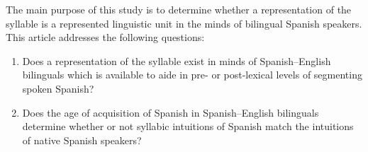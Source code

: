 \documentclass[
12pt, %
english, %
doublespacing, %
nolistspacing, %
liststotoc, %
headsepline, %
chapterinoneline, %
openany, %
]{DoctoralThesis}\usepackage[]{graphicx}\usepackage[]{color}
\begin{document}
The main purpose of this study is to determine whether a representation of the syllable is a represented linguistic unit in the minds of bilingual Spanish speakers. This article addresses the following questions:
\begin{enumerate}
\item{Does a representation of the syllable exist in minds of Spanish–English bilinguals which is available to aide in pre- or post-lexical levels of segmenting spoken Spanish?}
\item{Does the age of acquisition of Spanish in Spanish–English bilinguals determine whether or not syllabic intuitions of Spanish match the intuitions of native Spanish speakers?}
\end{enumerate}
\end{document}
